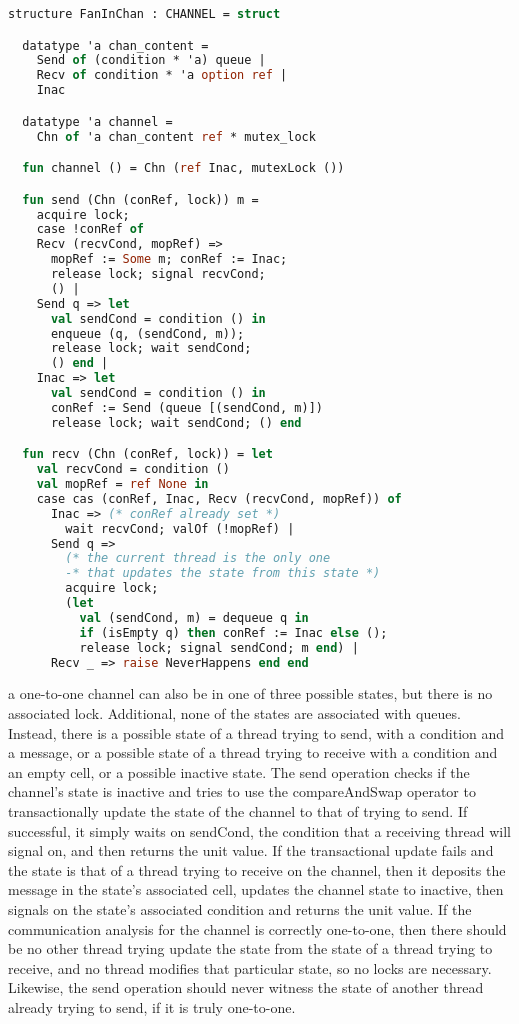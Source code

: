 \documentclass{article}
\begin{document}
\begin{lstlisting}[language=ML, style=codestyle1, escapechar=\%]
  structure FanInChan : CHANNEL = struct

  datatype 'a chan_content =
    Send of (condition * 'a) queue |
    Recv of condition * 'a option ref |
    Inac

  datatype 'a channel =
    Chn of 'a chan_content ref * mutex_lock

  fun channel () = Chn (ref Inac, mutexLock ())

  fun send (Chn (conRef, lock)) m = 
    acquire lock;
    case !conRef of
    Recv (recvCond, mopRef) => 
      mopRef := Some m; conRef := Inac;
      release lock; signal recvCond;
      () |
    Send q => let
      val sendCond = condition () in
      enqueue (q, (sendCond, m));
      release lock; wait sendCond;
      () end |
    Inac => let
      val sendCond = condition () in
      conRef := Send (queue [(sendCond, m)])
      release lock; wait sendCond; () end 

  fun recv (Chn (conRef, lock)) = let
    val recvCond = condition () 
    val mopRef = ref None in
    case cas (conRef, Inac, Recv (recvCond, mopRef)) of
      Inac => (* conRef already set *)
        wait recvCond; valOf (!mopRef) |
      Send q =>
        (* the current thread is the only one
        -* that updates the state from this state *)
        acquire lock;
        (let
          val (sendCond, m) = dequeue q in
          if (isEmpty q) then conRef := Inac else (); 
          release lock; signal sendCond; m end) |
      Recv _ => raise NeverHappens end end

  \end{lstlisting}

a one-to-one channel can also be in one of three possible states, but there is no associated
lock. Additional, none of the states are associated with queues.  Instead, there is a possible
state of a thread trying to send, with a condition and a message, or a possible state of a
thread trying to receive with a condition and an empty cell, or a possible inactive state.
The send operation checks if the channel's state is inactive and tries to use the
compareAndSwap operator to transactionally update the state of the channel to that of trying to
send.  If successful, it simply waits on sendCond, the condition that a receiving thread will
signal on, and then returns the unit value.  If the transactional update fails and the state is
that of a thread trying to receive on the channel, then it deposits the message in the state's
associated cell, updates the channel state to inactive, then signals on the state's associated
condition and returns the unit value.  If the communication analysis for the channel is
correctly one-to-one, then there should be no other thread trying update the state from the
state of a thread trying to receive, and no thread modifies that particular state, so no locks
are necessary.  Likewise, the send operation should never witness the state of another thread
already trying to send, if it is truly one-to-one.
\end{document}
